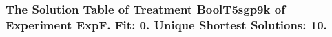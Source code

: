 \begin{frame}
 \fontsize{8pt}{9pt}\selectfont
 \frametitle{ The Solution Table of Treatment BoolT5sgp9k of Experiment ExpF. Fit: 0. Unique Shortest Solutions: 10. }

 \label{ExpFSolutionTable010.tex}  
 \end{frame}

